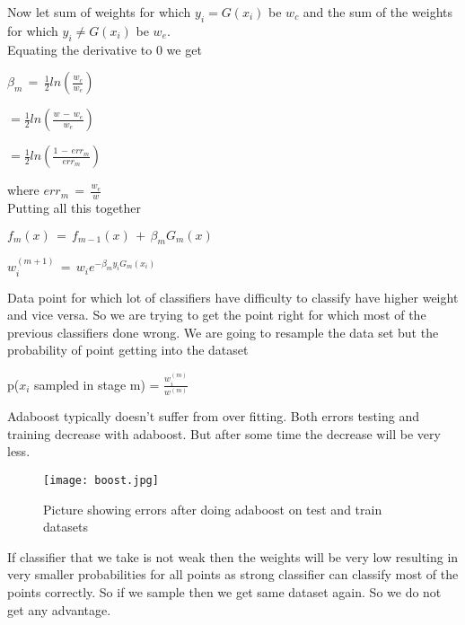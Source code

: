 \documentclass[twoside]{article}
\begin{document}
Now let sum of weights for which $y_{i} = G(x_{i})$ be $w_{c}$ and the sum of the weights for which $y_{i} \neq G(x_{i})$ be $w_{e}$.\\
Equating the derivative to 0 we get 
\begin{center}
$\beta_{m}\, = \, \frac{1}{2}ln(\frac{w_{c}}{w_{e}})$\\
\end{center}
\begin{center}
$= \frac{1}{2} ln(\frac{w \,-\,w_{e} }{w_{e}})$\\
\end{center}
\begin{center}
$= \frac{1}{2} ln(\frac{1\,-\, err_{m}}{err_{m}})$
\end{center}
where $err_{m}\, = \,\frac{w_{e}}{w}$\\
Putting all this together\\
\begin{center}
$f_{m}(x)\,=\,f_{m-1}(x)\,+\,\beta_{m}G_{m}(x)$\\
\end{center}
\begin{center}
$w_{i}^{(m+1)}\,=\,w_{i}e^{-\beta_{m}y_{i}G_{m}(x_{i})}$
\end{center}
Data point for which lot of classifiers have difficulty to classify have higher weight and vice versa. So we are trying to get the point right for which most of the previous classifiers done wrong. We are going to resample the data set but the probability of point getting into the dataset
\begin{center}
p($x_{i}$ sampled in stage m) = $\frac{w_{i}^{(m)}}{w^{(m)}}$
\end{center}
Adaboost typically doesn't suffer from over fitting. Both errors testing and training decrease with adaboost. But after some time the decrease will be very less.

\begin{figure}
\centering
\texttt{[image: boost.jpg]}
\caption{Picture showing errors after doing adaboost on test and train datasets}
\end{figure}


If classifier that we take is not weak then the weights will be very low resulting in very smaller probabilities for all points as strong classifier can classify most of the points correctly. So if we sample then we get same dataset again. So we do not get any advantage.\\
\end{document}
